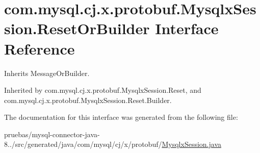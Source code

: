 \hypertarget{interfacecom_1_1mysql_1_1cj_1_1x_1_1protobuf_1_1_mysqlx_session_1_1_reset_or_builder}{}\section{com.\+mysql.\+cj.\+x.\+protobuf.\+Mysqlx\+Session.\+Reset\+Or\+Builder Interface Reference}
\label{interfacecom_1_1mysql_1_1cj_1_1x_1_1protobuf_1_1_mysqlx_session_1_1_reset_or_builder}


Inherits Message\+Or\+Builder.



Inherited by com.\+mysql.\+cj.\+x.\+protobuf.\+Mysqlx\+Session.\+Reset, and com.\+mysql.\+cj.\+x.\+protobuf.\+Mysqlx\+Session.\+Reset.\+Builder.



The documentation for this interface was generated from the following file\+:\begin{DoxyCompactItemize}
\item 
pruebas/mysql-\/connector-\/java-\/8../src/generated/java/com/mysql/cj/x/protobuf/\mbox{\hyperlink{generated_2java_2com_2mysql_2cj_2x_2protobuf_2_mysqlx_session_8java}{Mysqlx\+Session.\+java}}\end{DoxyCompactItemize}
